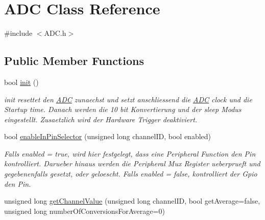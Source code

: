 \hypertarget{class_a_d_c}{}\section{A\+D\+C Class Reference}
\label{class_a_d_c}


{\ttfamily \#include $<$A\+D\+C.\+h$>$}

\subsection*{Public Member Functions}
\begin{DoxyCompactItemize}
\item 
\hypertarget{class_a_d_c_a7873fde0b99f5ec62ec644ad360a5fe3}{}bool \hyperlink{class_a_d_c_a7873fde0b99f5ec62ec644ad360a5fe3}{init} ()\label{class_a_d_c_a7873fde0b99f5ec62ec644ad360a5fe3}

\begin{DoxyCompactList}\small\item\em init resettet den \hyperlink{class_a_d_c}{A\+D\+C} zunaechst und setzt anschliessend die \hyperlink{class_a_d_c}{A\+D\+C} clock und die Startup time. Danach werden die 10 bit Konvertierung und der sleep Modus eingestellt. Zusaetzlich wird der Hardware Trigger deaktiviert. \end{DoxyCompactList}\item 
\hypertarget{class_a_d_c_a05dc44823439ae8da18dec84f7781504}{}bool \hyperlink{class_a_d_c_a05dc44823439ae8da18dec84f7781504}{enable\+In\+Pin\+Selector} (unsigned long channel\+I\+D, bool enabled)\label{class_a_d_c_a05dc44823439ae8da18dec84f7781504}

\begin{DoxyCompactList}\small\item\em Falls enabled = true, wird hier festgelegt, dass eine Peripheral Function den Pin kontrolliert. Darueber hinaus werden die Peripheral Mux Register ueberprueft und gegebenenfalls gesetzt, oder geloescht. Falls enabled = false, kontrolliert der Gpio den Pin. \end{DoxyCompactList}\item 
\hypertarget{class_a_d_c_a43424251947be64d25ea228efa4e012e}{}unsigned long \hyperlink{class_a_d_c_a43424251947be64d25ea228efa4e012e}{get\+Channel\+Value} (unsigned long channel\+I\+D, bool get\+Average=false, unsigned long number\+Of\+Conversions\+For\+Average=0)\label{class_a_d_c_a43424251947be64d25ea228efa4e012e}


\end{DoxyCompactItemize}
